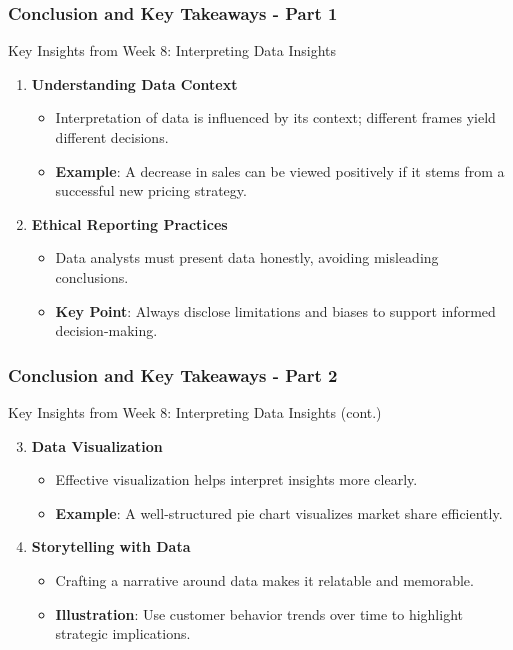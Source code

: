 \documentclass[aspectratio=169]{beamer}
\begin{document}
\begin{frame}[fragile]
    \frametitle{Conclusion and Key Takeaways - Part 1}
    \begin{block}{Key Insights from Week 8: Interpreting Data Insights}
        \begin{enumerate}
            \item \textbf{Understanding Data Context}
                \begin{itemize}
                    \item Interpretation of data is influenced by its context; different frames yield different decisions.
                    \item \textbf{Example}: A decrease in sales can be viewed positively if it stems from a successful new pricing strategy.
                \end{itemize}

            \item \textbf{Ethical Reporting Practices}
                \begin{itemize}
                    \item Data analysts must present data honestly, avoiding misleading conclusions.
                    \item \textbf{Key Point}: Always disclose limitations and biases to support informed decision-making.
                \end{itemize}
        \end{enumerate}
    \end{block}
\end{frame}

\begin{frame}[fragile]
    \frametitle{Conclusion and Key Takeaways - Part 2}
    \begin{block}{Key Insights from Week 8: Interpreting Data Insights (cont.)}
        \begin{enumerate}
            \setcounter{enumi}{2}
            \item \textbf{Data Visualization}
                \begin{itemize}
                    \item Effective visualization helps interpret insights more clearly.
                    \item \textbf{Example}: A well-structured pie chart visualizes market share efficiently.
                \end{itemize}

            \item \textbf{Storytelling with Data}
                \begin{itemize}
                    \item Crafting a narrative around data makes it relatable and memorable.
                    \item \textbf{Illustration}: Use customer behavior trends over time to highlight strategic implications.
                \end{itemize}
        \end{enumerate}
    \end{block}
\end{frame}
\end{document}
